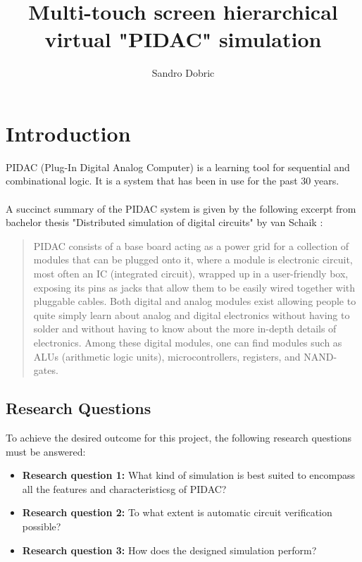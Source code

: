 \documentclass[twoside]{uva-inf-bachelor-thesis}
\title{Multi-touch screen hierarchical virtual "PIDAC" simulation}
\author{Sandro Dobric}
\begin{document}
\maketitle

\begin{abstract}
\begin{center}
\end{center}
\end{abstract}

\tableofcontents

\chapter{Introduction}
PIDAC (Plug-In Digital Analog Computer) is a learning tool for sequential and combinational logic. It is a system that has been in use for the past 30 years.
\\
\\
A succinct summary of the PIDAC system is given by the following excerpt from bachelor thesis "Distributed simulation of digital circuits" by van Schaik  \cite{Schaik}:
\\
\begin{quote}
PIDAC consists of a base board acting as a power grid for a collection of modules that can be plugged onto it, where a module is electronic circuit, most often an IC (integrated circuit), wrapped up in a user-friendly box, exposing its pins as jacks that allow them to be easily wired together with pluggable cables. Both digital and analog modules exist allowing people to quite simply learn about analog and digital electronics without having to solder and without having to know about the more in-depth details of electronics. Among these digital modules, one can find modules such as ALUs (arithmetic logic units), microcontrollers, registers, and NAND-gates. \end{quote}
\section{Research Questions}
To achieve the desired outcome for this project, the following research questions must be answered:
\begin{itemize}
  \item \textbf{Research question 1:} What kind of simulation is best suited to encompass all the features and characteristicsg of PIDAC?
  \item \textbf{Research question 2:} To what extent is automatic circuit verification possible?
  \item \textbf{Research question 3:} How does the designed simulation perform?
\end{itemize}
\end{document}
